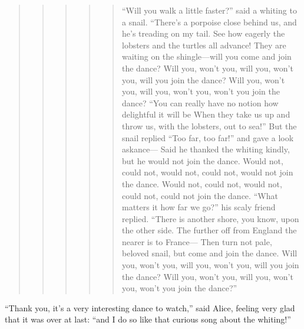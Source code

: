 \documentclass[11pt,openany,oneside]{book}
\begin{document}
\begin{quote}
\begin{quote}
\begin{quote}
\begin{quote}
\begin{quote}
{\small “Will you walk a little faster?” said a whiting to a snail.}\newline
{\small  “There’s a porpoise close behind us, and he’s treading on my tail.}\newline
{\small  See how eagerly the lobsters and the turtles all advance!}\newline
{\small  They are waiting on the shingle—will you come and join the dance?}\newline
{\small  Will you, won’t you, will you, won’t you, will you join the dance?}\newline
{\small  Will you, won’t you, will you, won’t you, won’t you join the dance?}\newline
{\small  }\newline
{\small  “You can really have no notion how delightful it will be}\newline
{\small  When they take us up and throw us, with the lobsters, out to sea!”}\newline
{\small  But the snail replied “Too far, too far!” and gave a look askance—}\newline
{\small  Said he thanked the whiting kindly, but he would not join the dance.}\newline
{\small  Would not, could not, would not, could not, would not join the dance.}\newline
{\small  Would not, could not, would not, could not, could not join the dance.}\newline
{\small  }\newline
{\small  “What matters it how far we go?” his scaly friend replied.}\newline
{\small  “There is another shore, you know, upon the other side.}\newline
{\small  The further off from England the nearer is to France—}\newline
{\small  Then turn not pale, beloved snail, but come and join the dance.}\newline
{\small  Will you, won’t you, will you, won’t you, will you join the dance?}\newline
{\small  Will you, won’t you, will you, won’t you, won’t you join the dance?” }

\end{quote}
\end{quote}
\end{quote}
\end{quote}
\end{quote}
“Thank you, it’s a very interesting dance to watch,” said Alice, feeling very glad that it was over at last: “and I do so like that curious song about the whiting!” 
\end{document}
